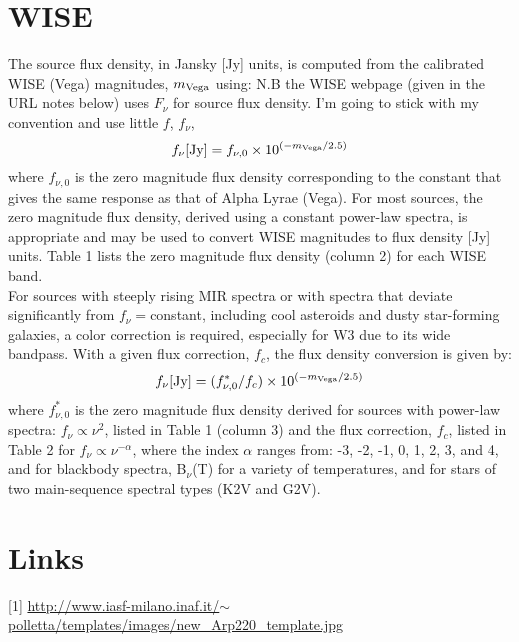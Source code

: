\documentclass[11pt,a4paper]{article}
\begin{document}
\section{WISE}
The source flux density, in Jansky [Jy] units, is computed from the calibrated WISE (Vega) magnitudes, $m_{\rm Vega}$ using:
N.B the WISE webpage (given in the URL notes below) uses $F_{\nu}$ for source flux density. I'm going to stick with my convention and use little $f$, $f_{\nu}$, 
\begin{equation}
  f_{\nu} [{\rm Jy}]  =  f_{\nu, 0} \times 10^{(-m_{\rm Vega}/2.5)} 
\end{equation}
where $f_{\nu, 0}$ is the zero magnitude flux density corresponding to the constant that gives the same response as that of Alpha Lyrae (Vega). For most sources, the zero magnitude flux density, derived using a constant power-law spectra, is appropriate and may be used to convert WISE magnitudes to flux density [Jy] units. Table 1 lists the zero magnitude flux density (column 2) for each WISE band.\\

\noindent
For sources with steeply rising MIR spectra or with spectra that deviate significantly from $f_{\nu}=$constant, including cool asteroids and dusty star-forming galaxies, a color correction is required, especially for W3 due to its wide bandpass. With a given flux correction, $f_{c}$, the flux density conversion is given by:
\begin{equation}
  f_{\nu} [{\rm Jy}]  = (f^{*}_{\nu, 0}/f_{c}) \times 10^{(-m_{\rm Vega}/2.5)} 
\end{equation}
where $f^{*}_{\nu, 0}$ is the zero magnitude flux density derived for sources with power-law spectra: $f_{\nu} \propto \nu^{2}$, listed in Table 1 (column 3) and the flux correction, $f_{c}$, listed in Table 2 for $f_{\nu} \propto \nu^{-\alpha}$, where the index $\alpha$  ranges from: -3, -2, -1, 0, 1, 2, 3, and 4, and for blackbody spectra, B$_{\nu}$(T) for a variety of temperatures, and for stars of two main-sequence spectral types (K2V and G2V). 


\section{Links}
[1] \href{http://www.iasf-milano.inaf.it/$\sim$polletta/templates/images/new\_Arp220\_template.jpg}{http://www.iasf-milano.inaf.it/$\sim$polletta/templates/images/new\_Arp220\_template.jpg}
\end{document}
